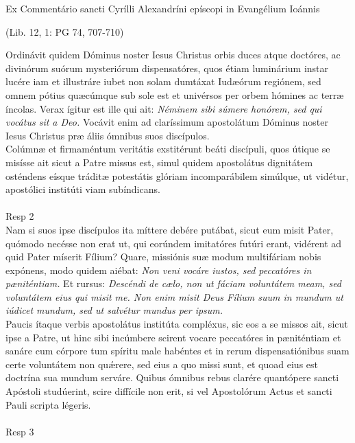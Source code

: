 \documentclass[options]{article}
\begin{document}
	Ex Commentário sancti Cyrílli Alexandríni epíscopi in Evangélium Ioánnis 
	\begin{flushright}
		(Lib. 12, 1: PG 74, 707-710)
	\end{flushright}
Ordinávit quidem Dóminus noster Iesus Christus orbis duces atque doctóres, ac divinórum suórum mysteriórum dispensatóres, quos étiam luminárium instar lucére iam et illustráre iubet non solam dumtáxat Iudæórum regiónem, sed omnem pótius quæcúmque sub sole est et univérsos per orbem hómines ac terræ íncolas. Verax ígitur est ille qui ait: 
\emph{Néminem sibi súmere honórem, sed qui vocátus sit a Deo.}
Vocávit enim ad claríssimum apostolátum Dóminus noster Iesus Christus præ áliis ómnibus suos discípulos.\\
  Colúmnæ et firmaméntum veritátis exstitérunt beáti discípuli, quos útique se misísse ait sicut a Patre missus est, simul quidem apostolátus dignitátem osténdens eísque tráditæ potestátis glóriam incomparábilem simúlque, ut vidétur, apostólici institúti viam subíndicans.\\
\\
Resp 2 
\\
 Nam si suos ipse discípulos ita míttere debére putábat, sicut eum misit Pater, quómodo necésse non erat ut, qui eorúndem imitatóres futúri erant, vidérent ad quid Pater míserit Fílium? Quare, missiónis suæ modum multifáriam nobis expónens, modo quidem aiébat: 
 \emph{Non veni vocáre iustos, sed peccatóres in pæniténtiam.}
 Et rursus: 
 \emph{Descéndi de cælo, non ut fáciam voluntátem meam, sed voluntátem eius qui misit me. Non enim misit Deus Fílium suum in mundum ut iúdicet mundum, sed ut salvétur mundus per ipsum.}\\
  Paucis ítaque verbis apostolátus institúta compléxus, sic eos a se missos ait, sicut ipse a Patre, ut hinc sibi incúmbere scirent vocare peccatóres in pæniténtiam et sanáre cum córpore tum spíritu male habéntes et in rerum dispensatiónibus suam certe voluntátem non qu\'{æ}rere, sed eius a quo missi sunt, et quoad eius est doctrína sua mundum serváre. Quibus ómnibus rebus clarére quantópere sancti Apóstoli studúerint, scire diffícile non erit, si vel Apostolórum Actus et sancti Pauli scripta légeris.\\
  \\
  Resp 3
\end{document}

